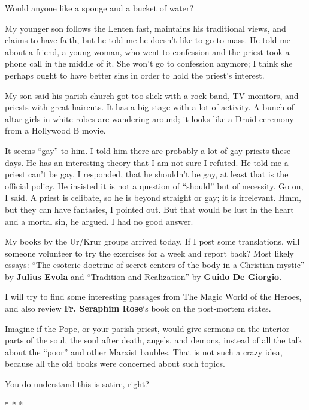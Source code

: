 Would anyone like a sponge and a bucket of water?

My younger son follows the Lenten fast, maintains his traditional views, and claims to have faith, but he told me he doesn't like to go to mass. He told me about a friend, a young woman, who went to confession and the priest took a phone call in the middle of it. She won't go to confession anymore; I think she perhaps ought to have better sins in order to hold the priest's interest.

My son said his parish church got too slick with a rock band, TV monitors, and priests with great haircuts. It has a big stage with a lot of activity. A bunch of altar girls in white robes are wandering around; it looks like a Druid ceremony from a Hollywood B movie.

It seems ``gay'' to him. I told him there are probably a lot of gay priests these days. He has an interesting theory that I am not sure I refuted. He told me a priest can't be gay. I responded, that he shouldn't be gay, at least that is the official policy. He insisted it is not a question of ``should'' but of necessity. Go on, I said. A priest is celibate, so he is beyond straight or gay; it is irrelevant. Hmm, but they can have fantasies, I pointed out. But that would be lust in the heart and a mortal sin, he argued. I had no good answer.

My books by the Ur/Krur groups arrived today. If I post some translations, will someone volunteer to try the exercises for a week and report back? Most likely essays: ``The esoteric doctrine of secret centers of the body in a Christian mystic'' by \textbf{Julius Evola} and ``Tradition and Realization'' by \textbf{Guido De Giorgio}.

I will try to find some interesting passages from The Magic World of the Heroes, and also review \textbf{Fr. Seraphim Rose}`s book on the post-mortem states.

Imagine if the Pope, or your parish priest, would give sermons on the interior parts of the soul, the soul after death, angels, and demons, instead of all the talk about the ``poor'' and other Marxist baubles. That is not such a crazy idea, because all the old books were concerned about such topics.

You do understand this is satire, right?



\begin{center}* * *\end{center}

